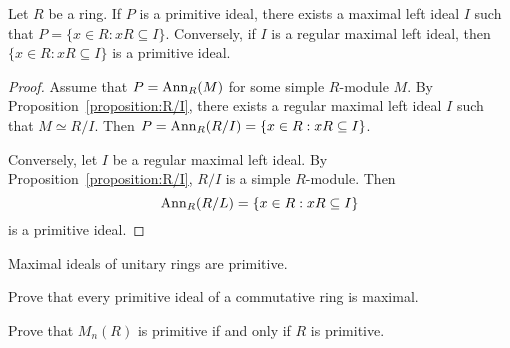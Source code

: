 %

\begin{lemma}
	\label{lemma:maxprim}
	Let $R$ be a ring. If $P$ is a primitive ideal, there exists a maximal 
	left ideal $I$ such that $P=\{x\in R:xR\subseteq I\}$.
	Conversely, if $I$ is a regular maximal left ideal, then 
	$\{x\in R:xR\subseteq I\}$ is a primitive ideal. 
\end{lemma}

\begin{proof}
	Assume that $P=\operatorname{Ann}_R(M)$ for some simple $R$-module $M$. By
	Proposition~\ref{proposition:R/I}, there exists a regular maximal 
	left ideal 
	$I$ such that $M\simeq R/I$. Then $P=\operatorname{Ann}_R(R/I)=\{x\in
	R:xR\subseteq I\}$. 

	Conversely, let $I$ be a regular maximal left ideal. By
	Proposition~\ref{proposition:R/I}, $R/I$ is a simple $R$-module. Then
	\[
	\operatorname{Ann}_R(R/L)=\{x\in R:xR\subseteq I\}
	\]
	is a primitive ideal.
\end{proof}


\begin{exercise}
\label{xca:maximal=>prim}
    Maximal ideals of unitary rings are primitive.  
\end{exercise}

\begin{exercise}
	Prove that every primitive ideal of a commutative ring is maximal.
\end{exercise}

\begin{exercise}
    Prove that $M_n(R)$ is primitive if and only if $R$ is primitive.
\end{exercise}




